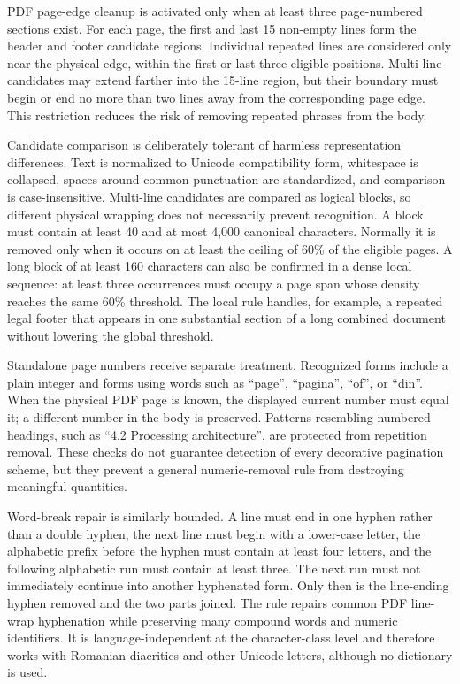 PDF page-edge cleanup is activated only when at least three page-numbered
sections exist. For each page, the first and last 15 non-empty lines form the
header and footer candidate regions. Individual repeated lines are considered
only near the physical edge, within the first or last three eligible positions.
Multi-line candidates may extend farther into the 15-line region, but their
boundary must begin or end no more than two lines away from the corresponding
page edge. This restriction reduces the risk of removing repeated phrases from
the body.

Candidate comparison is deliberately tolerant of harmless representation
differences. Text is normalized to Unicode compatibility form, whitespace is
collapsed, spaces around common punctuation are standardized, and comparison
is case-insensitive. Multi-line candidates are compared as logical blocks, so
different physical wrapping does not necessarily prevent recognition. A block
must contain at least 40 and at most 4,000 canonical characters. Normally it is
removed only when it occurs on at least the ceiling of 60\% of the eligible
pages. A long block of at least 160 characters can also be confirmed in a dense
local sequence: at least three occurrences must occupy a page span whose
density reaches the same 60\% threshold. The local rule handles, for example,
a repeated legal footer that appears in one substantial section of a long
combined document without lowering the global threshold.

Standalone page numbers receive separate treatment. Recognized forms include
a plain integer and forms using words such as ``page'', ``pagina'', ``of'', or
``din''. When the physical PDF page is known, the displayed current number must
equal it; a different number in the body is preserved. Patterns resembling
numbered headings, such as ``4.2 Processing architecture'', are protected from
repetition removal. These checks do not guarantee detection of every decorative
pagination scheme, but they prevent a general numeric-removal rule from
destroying meaningful quantities.

Word-break repair is similarly bounded. A line must end in one hyphen rather
than a double hyphen, the next line must begin with a lower-case letter, the
alphabetic prefix before the hyphen must contain at least four letters, and the
following alphabetic run must contain at least three. The next run must not
immediately continue into another hyphenated form. Only then is the line-ending
hyphen removed and the two parts joined. The rule repairs common PDF line-wrap
hyphenation while preserving many compound words and numeric identifiers. It is
language-independent at the character-class level and therefore works with
Romanian diacritics and other Unicode letters, although no dictionary is used.

